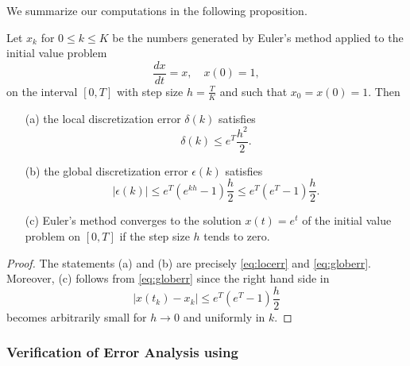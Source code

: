 \documentclass{ximera}
\begin{document}
We summarize our computations in the following proposition.
\begin{proposition}  \label{prop:globerr1}
Let $x_k$ for $0\le k\le K$ be the numbers generated by
Euler's method applied to the initial value problem
\[
\frac{dx}{dt} = x,\quad x(0)=1,
\]
on the interval $[0,T]$ with step size $h=\frac{T}{K}$ and
such that $x_0=x(0)=1$. Then
\begin{itemize}
\item[(a)] the local discretization error $\delta(k)$ satisfies
\[
\delta(k)\le e^T\frac{h^2}{2}.
\]
\item[(b)] the global discretization error $\epsilon(k)$ satisfies
\[
|\epsilon(k)| \le e^T(e^{kh}-1)\frac{h}{2} \le e^T(e^T-1)\frac{h}{2}.
\]
\item[(c)]  Euler's method 
converges to the solution $x(t)=e^t$ of
the initial value problem on $[0,T]$ if the step size $h$ tends
to zero.
\end{itemize}
\end{proposition}

\begin{proof} The statements (a) and (b) are precisely \eqref{eq:locerr} and
\eqref{eq:globerr}. Moreover, (c) follows from \eqref{eq:globerr} 
since the right hand side in
\[
|x(t_k)-x_k| \le e^T(e^T-1)\frac{h}{2}
\]
becomes arbitrarily small for $h\to 0$ and uniformly in $k$.
\end{proof}

\subsubsection*{Verification of Error Analysis using \Matlab}
\end{document}
